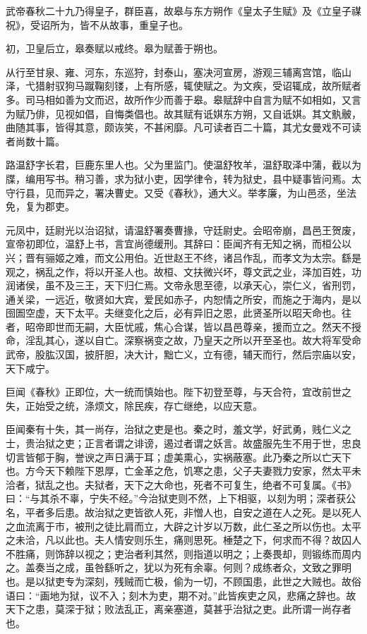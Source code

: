 \documentclass[12pt,UTF8]{ctexbook}
\begin{document}
武帝春秋二十九乃得皇子，群臣喜，故皋与东方朔作《皇太子生赋》及《立皇子禖祝》，受诏所为，皆不从故事，重皇子也。



初，卫皇后立，皋奏赋以戒终。皋为赋善于朔也。



从行至甘泉、雍、河东，东巡狩，封泰山，塞决河宣房，游观三辅离宫馆，临山泽，弋猎射驭狗马蹴鞠刻镂，上有所感，辄使赋之。为文疾，受诏辄成，故所赋者多。司马相如善为文而迟，故所作少而善于皋。皋赋辞中自言为赋不如相如，又言为赋乃俳，见视如倡，自悔类倡也。故其赋有诋娸东方朔，又自诋娸。其文骫骳，曲随其事，皆得其意，颇诙笑，不甚闲靡。凡可读者百二十篇，其尤女曼戏不可读者尚数十篇。



路温舒字长君，巨鹿东里人也。父为里监门。使温舒牧羊，温舒取泽中蒲，截以为牒，编用写书。稍习善，求为狱小吏，因学律令，转为狱史，县中疑事皆问焉。太守行县，见而异之，署决曹史。又受《春秋》，通大义。举孝廉，为山邑丞，坐法免，复为郡吏。



元凤中，廷尉光以治诏狱，请温舒署奏曹掾，守廷尉史。会昭帝崩，昌邑王贺废，宣帝初即位，温舒上书，言宜尚德缓刑。其辞曰：臣闻齐有无知之祸，而桓公以兴；晋有骊姬之难，而文公用伯。近世赵王不终，诸吕作乱，而孝文为太宗。繇是观之，祸乱之作，将以开圣人也。故桓、文扶微兴坏，尊文武之业，泽加百姓，功润诸侯，虽不及三王，天下归仁焉。文帝永思至德，以承天心，崇仁义，省刑罚，通关梁，一远近，敬贤如大宾，爱民如赤子，内恕情之所安，而施之于海内，是以囹圄空虚，天下太平。夫继变化之后，必有异旧之恩，此贤圣所以昭天命也。往者，昭帝即世而无嗣，大臣忧戚，焦心合谋，皆以昌邑尊亲，援而立之。然天不授命，淫乱其心，遂以自亡。深察祸变之故，乃皇天之所以开至圣也。故大将军受命武帝，股肱汉国，披肝胆，决大计，黜亡义，立有德，辅天而行，然后宗庙以安，天下咸宁。



巨闻《春秋》正即位，大一统而慎始也。陛下初登至尊，与天合符，宜改前世之失，正始受之统，涤烦文，除民疾，存亡继绝，以应天意。



臣闻秦有十失，其一尚存，治狱之吏是也。秦之时，羞文学，好武勇，贱仁义之士，贵治狱之吏；正言者谓之诽谤，遏过者谓之妖言。故盛服先生不用于世，忠良切言皆郁于胸，誉谀之声日满于耳；虚美熏心，实祸蔽塞。此乃秦之所以亡天下也。方今天下赖陛下恩厚，亡金革之危，饥寒之患，父子夫妻戮力安家，然太平未洽者，狱乱之也。夫狱者，天下之大命也，死者不可复生，绝者不可复属。《书》曰：“与其杀不辜，宁失不经。”今治狱吏则不然，上下相驱，以刻为明；深者获公名，平者多后患。故治狱之吏皆欲人死，非憎人也，自安之道在人之死。是以死人之血流离于市，被刑之徒比肩而立，大辟之计岁以万数，此仁圣之所以伤也。太平之未洽，凡以此也。夫人情安则乐生，痛则思死。棰楚之下，何求而不得？故囚人不胜痛，则饰辞以视之；吏治者利其然，则指道以明之；上奏畏却，则锻练而周内之。盖奏当之成，虽咎繇听之，犹以为死有余辜。何则？成练者众，文致之罪明也。是以狱吏专为深刻，残贼而亡极，偷为一切，不顾国患，此世之大贼也。故俗语曰：“画地为狱，议不入；刻木为吏，期不对。”此皆疾吏之风，悲痛之辞也。故天下之患，莫深于狱；败法乱正，离亲塞道，莫甚乎治狱之吏。此所谓一尚存者也。
\end{document}
